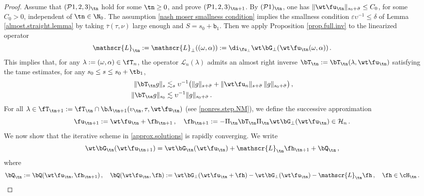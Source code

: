 \documentclass[a4paper,reqno,10pt]{article}
\newcommand{\sL}{\mathscr{L}}
\begin{document}
\begin{proof}
\noindent
{\sc Assume that $({\mathcal P}1,2,3)_{\tn}$ hold for some $\tn \geq 0$, 
and prove $({\mathcal P}1,2,3)_{\tn+1}$.}
By $({\mathcal P}1)_{\tn}$, one has $\| \wt\fu_{\tn} \|_{s_0 + \bar \sigma} \leq C_0$, for some $C_0 > 0$, independent of $\tn\in\N_0$.  
The assumption %
\eqref{nash moser smallness condition} implies 
the smallness condition 
$\varepsilon \upsilon^{- 1} \leq \delta$ 
of Lemma \ref{almost.straight.lemma}
by taking $\overline \tau (\tau, \nu)$ large enough and $S = s_0 + \mathtt b_1$. 
Then we apply Proposition \ref{prop.full.inv}  %
to the linearized operator 
\begin{equation}\label{def.sL.n}
\sL_{\tn} := \sL_{\perp}((\omega,\alpha)) : = \di_{\fu_{\perp}} \wt\bG_{\perp} (\wt\fu_{\tn}(\omega,\alpha)) \,.
\end{equation}
This implies that, for any $\lambda:=(\omega,\alpha)\in \fT_{n}$, the operator $\sL_{n}(\lambda)$ admits an almost right inverse $\bT_{\tn}:=\bT_{\tn}(\lambda,\wt\fu_{\tn})$ satisfying the tame estimates, for any $s_0 \leq s \leq s_0 + \tb_{1}$,
\begin{align}
\|  \bT_{\tn} g \|_s 
&\lesssim_{s}  \upsilon^{-1} \big( \| g \|_{s+\bar\sigma}
+ \| \wt\fu_{n} \|_{s + \bar\sigma} \,  
\| g \|_{s_0 +\bar\sigma} \big)\,,\label{est.sTn.s} \\
\|  \bT_{\tn} g \|_{s_0} 
& \lesssim  \upsilon^{-1} \| g \|_{s_0 +\bar\sigma } \,. \label{est.sTm.s0} 
\end{align}
For all $\lambda \in \fT_{\tn+1} := \fT_{\tn} \cap \b\Lambda_{\tn+1}(\upsilon_{\tn},\tau,\wt\fu_{\tn})$ (see \eqref{nonres.step.NM}), we define the successive approximation 
\begin{equation}\label{approx.solutions}
\fu_{\tn + 1} := \wt\fu_{\tn} + \fh_{\tn + 1} \,, \quad 
\fh_{\tn + 1} :=  - \Pi_{\tn} \bT_{\tn}  \Pi_{\tn} \wt\bG_{\perp}(\wt\fu_{\tn}) %
\in {\mathcal H}_{n} \,.
\end{equation}
We now show that the iterative scheme in \eqref{approx.solutions} is rapidly converging. We write
\begin{equation}
    \wt\bG_{\tn}(\wt\fu_{\tn+1}) =  \wt\bG_{\tn}(\wt\fu_{\tn})  + \sL_{\tn} \fh_{\tn+1}+ \bQ_{\tn}\,,
\end{equation}
where
\begin{equation}\label{bQ.n}
    \bQ_{\tn} := \bQ(\wt\fu_{\tn},\fh_{\tn+1})\,, \quad  \bQ(\wt\fu_{\tn},\fh) := \wt\bG_{\perp}(\wt\fu_{\tn} + \fh) - \wt\bG_{\perp}(\wt\fu_{\tn}) - \sL_{\tn} \fh \,, \quad \fh \in \cH_{\tn} \,.

\end{equation}
\end{proof}
\end{document}
